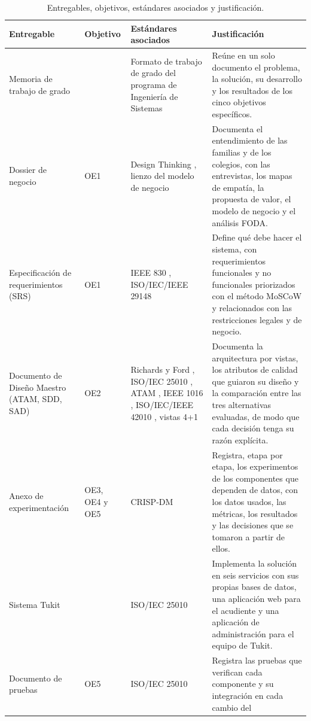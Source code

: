 \begin{table}[H]
\centering\footnotesize
\setlength{\tabcolsep}{4pt}
\renewcommand{\arraystretch}{1.1}
\caption{Entregables, objetivos, estándares asociados y justificación.}
\label{tab:entregables}
\begin{tabularx}{\textwidth}{@{}p{3cm}p{1.4cm}p{3.2cm}X@{}}
\toprule
Entregable & Objetivo & Estándares asociados & Justificación \\
\midrule
Memoria de trabajo de grado &  &
Formato de trabajo de grado del programa de Ingeniería de Sistemas &
Reúne en un solo documento el problema, la solución, su desarrollo y los resultados de los
cinco objetivos específicos. \\
Dossier de negocio & OE1 &
Design Thinking \citep{brown_design_2008}, lienzo del modelo de negocio
\citep{osterwalder_business_2010} &
Documenta el entendimiento de las familias y de los colegios, con las entrevistas, los mapas
de empatía, la propuesta de valor, el modelo de negocio y el análisis FODA. \\
Especificación de requerimientos (SRS) & OE1 &
IEEE 830 \citep{ieee_830_1998}, ISO/IEC/IEEE 29148 \citep{iso_29148_2018} &
Define qué debe hacer el sistema, con requerimientos funcionales y no funcionales
priorizados con el método MoSCoW y relacionados con las restricciones legales y de
negocio. \\
Documento de Diseño Maestro (ATAM, SDD, SAD) & OE2 &
Richards y Ford \citep{richards_fundamentals_2025}, ISO/IEC 25010 \citep{iso_25010_2011},
ATAM \citep{bass_software_2021}, IEEE 1016 \citep{ieee_1016_2009}, ISO/IEC/IEEE 42010
\citep{iso_42010_2022}, vistas 4+1 \citep{kruchten_41_1995} &
Documenta la arquitectura por vistas, los atributos de calidad que guiaron su diseño y la
comparación entre las tres alternativas evaluadas, de modo que cada decisión tenga su
razón explícita. \\
Anexo de experimentación & OE3, OE4 y OE5 &
CRISP-DM \citep{chapman_crisp-dm_2000} &
Registra, etapa por etapa, los experimentos de los componentes que dependen de datos, con
los datos usados, las métricas, los resultados y las decisiones que se tomaron a partir de
ellos. \\
Sistema Tukit & &
ISO/IEC 25010 \citep{iso_25010_2011} &
Implementa la solución en seis servicios con sus propias bases de datos, una aplicación
web para el acudiente y una aplicación de administración para el equipo de Tukit. \\
Documento de pruebas & OE5 &
ISO/IEC 25010 \citep{iso_25010_2011} &
Registra las pruebas que verifican cada componente y su integración en cada cambio del

\end{tabularx}
\end{table}
